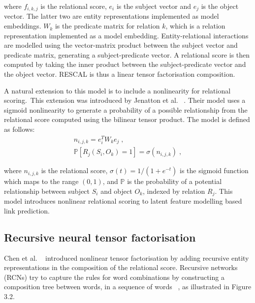 \noindent where $ f_{i,k,j} $ is the relational score, $ e_i $ is the subject vector and $ e_j $ is the object vector. The latter two are entity representations implemented as model embeddings. $ W_k $ is the predicate matrix for relation $ k $, which is a relation representation implemented as a model embedding. Entity-relational interactions are modelled using the vector-matrix product between the subject vector and predicate matrix, generating a subject-predicate vector. A relational score is then computed by taking the inner product between the subject-predicate vector and the object vector. RESCAL is thus a linear tensor factorisation composition. \par

\noindent A natural extension to this model is to include a nonlinearity for relational scoring.\ This extension was introduced by Jenatton et al. \unskip ~\citep{jenatton2012latent}. Their model uses a sigmoid nonlinearity to generate a probability of a possible relationship from the relational score computed using the bilinear tensor product. The model is defined as follows:
\begin{subequations}
	\begin{gather}
		n_{i,j,k} = e_i^TW_ke_j \; , \\
		\mathbb{P}\left [ R_j(S_i, O_k) = 1 \right ] = \sigma(n_{i,j,k}) \; ,
	\end{gather}
\end{subequations}

\noindent where $ n_{i,j,k} $ is the relational score, $ \sigma(t) = 1/(1 + e^{-t}) $ is the sigmoid function which maps to the range $ (0,1) $, and $\mathbb{P}$ is the probability of a potential relationship between subject $ S_i $ and object $ O_k $, indexed by relation $ R_j $. This model introduces nonlinear relational scoring to latent feature modelling based link prediction. 



\subsection{Recursive neural tensor factorisation}

Chen et al. \unskip ~\citep{socher2013reasoning} introduced nonlinear tensor factorisation by adding recursive entity representations in the composition of the relational score. Recursive networks (RCNs) try to capture the rules for word combinations by constructing a composition tree between words, in a sequence of words \unskip ~\citep{socher2012semantic}, as illustrated in Figure 3.2. \par

